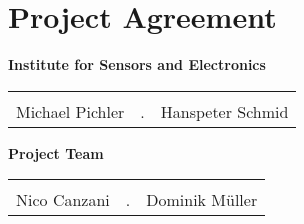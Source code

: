 \section{Project Agreement}
\label{sec:project_agreement}
\textbf{Institute for Sensors and Electronics}
\vspace{1cm}

\begin{table}[h]
	\renewcommand{\arraystretch}{1.5}
	\begin{tabularx}{\textwidth}{C{5cm} >{\centering}X C{5cm}}
		 & & \\  
		Michael Pichler & \the\day.\MONTH \the\year & Hanspeter Schmid \\
	\end{tabularx}
\end{table}

\vspace{1cm}

\textbf{Project Team}
\vspace{1cm}

\begin{table}[h]
	\renewcommand{\arraystretch}{1.5}
	\begin{tabularx}{\textwidth}{C{5cm} >{\centering}X C{5cm}}
		 & & \\  
		Nico Canzani & \the\day.\MONTH \the\year & Dominik M\"uller \\
	\end{tabularx}
\end{table}
